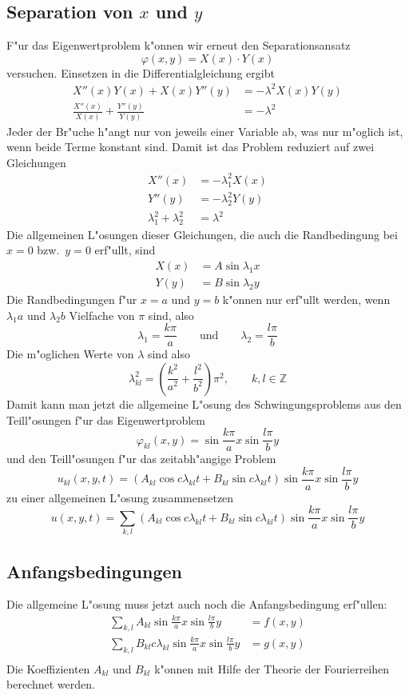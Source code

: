 \subsection{Separation von $x$ und $y$}
F"ur das Eigenwertproblem k"onnen wir erneut den Separationsansatz
\[
\varphi(x,y)=X(x)\cdot Y(x)
\]
versuchen.
Einsetzen in die Differentialgleichung ergibt
\begin{align*}
X''(x)Y(x)+X(x)Y''(y)&=-\lambda^2 X(x)Y(y)
\\
\frac{X''(x)}{X(x)}+\frac{Y''(y)}{Y(y)}&=-\lambda^2
\end{align*}
Jeder der Br"uche h"angt nur von jeweils einer Variable ab, was nur
m"oglich ist, wenn beide Terme konstant sind. Damit ist das Problem
reduziert auf zwei Gleichungen
\begin{align*}
X''(x)&=-\lambda_1^2X(x)\\
Y''(y)&=-\lambda_2^2Y(y)\\
\lambda_1^2+\lambda_2^2&=\lambda^2
\end{align*}
Die allgemeinen L"osungen dieser Gleichungen, die auch die Randbedingung
bei $x=0$ bzw.~$y=0$ erf"ullt, sind
\begin{align*}
X(x)&=A\sin \lambda_1x\\
Y(y)&=B\sin \lambda_2y
\end{align*}
Die Randbedingungen f"ur $x=a$ und $y=b$ k"onnen nur erf"ullt werden,
wenn $\lambda_1a$ und $\lambda_2b$ Vielfache von $\pi$ sind, also
\[
\lambda_1=\frac{k\pi}a
\qquad
\text{und}
\qquad
\lambda_2=\frac{l\pi}b
\]
Die m"oglichen Werte von $\lambda$ sind also
\[
\lambda_{kl}^2=\left(\frac{k^2}{a^2} + \frac{l^2}{b^2}\right)\pi^2,\qquad k,l\in\mathbb Z
\]
Damit kann man jetzt die allgemeine L"osung des Schwingungsproblems aus den
Teill"osungen f"ur das Eigenwertproblem
\[
\varphi_{kl}(x,y)=\sin \frac{k\pi}{a}x\sin\frac{l\pi}{b}y
\]
und den Teill"osungen f"ur das zeitabh"angige Problem
\[
u_{kl}(x,y,t)
=
(A_{kl}\cos c\lambda_{kl} t+
B_{kl}\sin c\lambda_{kl} t)
\sin \frac{k\pi}{a}x\sin\frac{l\pi}{b}y
\]
zu einer allgemeinen L"osung zusammensetzen
\begin{equation}
u(x,y,t)=\sum_{k,l}
(A_{kl}\cos c\lambda_{kl} t+
B_{kl}\sin c\lambda_{kl} t)
\sin \frac{k\pi}{a}x\sin\frac{l\pi}{b}y
\label{allgemeineloesung}
\end{equation}

\subsection{Anfangsbedingungen}
Die allgemeine L"osung muss jetzt auch noch die Anfangsbedingung erf"ullen:
\begin{align*}
\sum_{k,l}A_{kl}
\sin \frac{k\pi}{a}x\sin\frac{l\pi}{b}y&=f(x,y)\\
\sum_{k,l}B_{kl}c\lambda_{kl}
\sin \frac{k\pi}{a}x\sin\frac{l\pi}{b}y&=g(x,y)\\
\end{align*}
Die Koeffizienten $A_{kl}$ und $B_{kl}$ k"onnen mit Hilfe der Theorie
der Fourierreihen berechnet werden.

